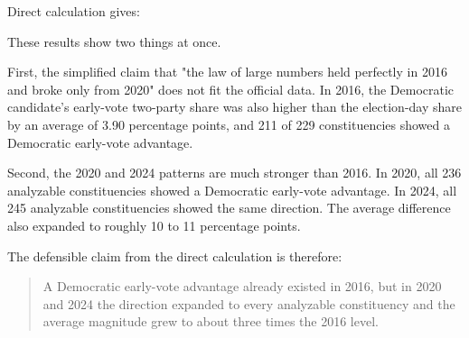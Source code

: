 \documentclass[preprint]{IEIE}
\begin{document}
Direct calculation gives:

\begin{center}
\scriptsize
{}
\end{center}

These results show two things at once.

First, the simplified claim that "the law of large numbers held perfectly in 2016 and broke only from 2020" does not fit the official data. In 2016, the Democratic candidate's early-vote two-party share was also higher than the election-day share by an average of 3.90 percentage points, and 211 of 229 constituencies showed a Democratic early-vote advantage.

Second, the 2020 and 2024 patterns are much stronger than 2016. In 2020, all 236 analyzable constituencies showed a Democratic early-vote advantage. In 2024, all 245 analyzable constituencies showed the same direction. The average difference also expanded to roughly 10 to 11 percentage points.

The defensible claim from the direct calculation is therefore:

\begin{quote}
A Democratic early-vote advantage already existed in 2016, but in 2020 and 2024 the direction expanded to every analyzable constituency and the average magnitude grew to about three times the 2016 level.
\end{quote}
\end{document}
